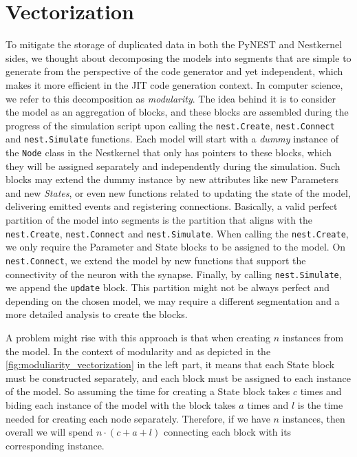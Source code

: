 \chapter{Vectorization}
 \label{chap:vec}
 
 To mitigate the storage of duplicated data in both the PyNEST and Nestkernel sides, we thought about decomposing the models into segments that are simple to generate from the perspective of the code generator and yet independent, which makes it more efficient in the JIT code generation context. In computer science, we refer to this decomposition as \emph{modularity}. The idea behind it is to consider the model as an aggregation of blocks, and these blocks are assembled during the progress of the simulation script upon calling the \texttt{nest.Create}, \texttt{nest.Connect} and \texttt{nest.Simulate} functions. Each model will start with a \emph{dummy} instance of the \texttt{Node} class in the Nestkernel that only has pointers to these blocks, which they will be assigned  separately and independently during the simulation. Such blocks may extend the dummy instance by new attributes like new Parameters and new \emph{States}, or even new functions related to updating the state of the model, delivering emitted events and registering connections. Basically, a valid perfect partition of the model into segments is the partition that aligns with the \texttt{nest.Create}, \texttt{nest.Connect} and \texttt{nest.Simulate}. When calling the \texttt{nest.Create}, we only require the Parameter and State blocks to be assigned to the model. On \texttt{nest.Connect}, we extend the model by new functions that support the connectivity of the neuron with the synapse. Finally, by calling \texttt{nest.Simulate}, we append the \texttt{update} block. This partition might not be always perfect and depending on the chosen model, we may require a different segmentation and a more detailed analysis to create the blocks. 


A problem might rise with this approach is that when creating $n$ instances from the model. In the context of modularity and as depicted in the \autoref{fig:moduliarity_vectorization} in the left part, it means that each State block must be constructed separately, and each block must be assigned to each instance of the model. So assuming the time for creating a State block takes $c$ times and biding each instance of the model with the block takes $a$ times and $l$ is the time needed for creating each node separately. Therefore, if we have $n$ instances, then overall we will spend $n \cdot (c + a + l)$ connecting each block with its corresponding instance. 

